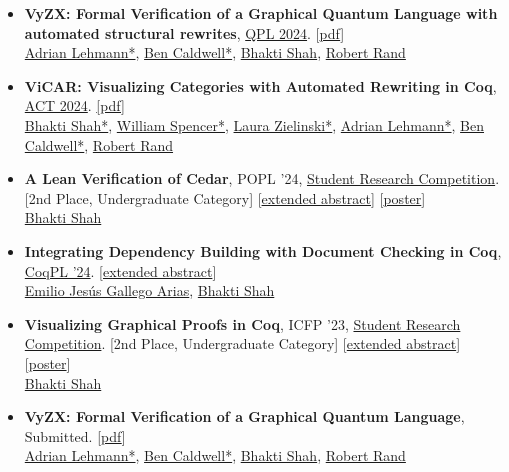 \documentclass[10pt]{res} %
\begin{document}
\begin{resume}
\begin{itemize}
\item \textbf{VyZX: Formal Verification of a Graphical Quantum Language with automated structural rewrites}, \href{https://qpl2024.dc.uba.ar/}{QPL 2024}. [\href{https://bhaktishh.github.io/papers/qpl-24-vyzx.pdf}{pdf}]\\
\href{https://adrianlehmann.net/}{Adrian Lehmann*}, \href{https://people.cs.uchicago.edu/~caldwellb/}{Ben Caldwell*}, \underline{Bhakti Shah}, \href{https://rand.cs.uchicago.edu/}{Robert Rand}

\item \textbf{ViCAR: Visualizing Categories with Automated Rewriting in Coq}, \href{https://oxford24.github.io/}{ACT 2024}. \href{https://arxiv.org/abs/2404.08163}{[pdf]}\\
\underline{Bhakti Shah*}, \href{.}{William Spencer*}, \href{.}{Laura Zielinski*}, \href{https://adrianlehmann.net/}{Adrian Lehmann*}, \href{https://people.cs.uchicago.edu/~caldwellb/}{Ben Caldwell*}, \href{https://rand.cs.uchicago.edu/}{Robert Rand}

\item \textbf{A Lean Verification of Cedar}, POPL '24, \href{https://popl24.sigplan.org/track/POPL-2024-student-research-competition}{Student Research Competition}. [2nd Place, Undergraduate Category] 
[\href{https://bhaktishh.github.io/papers/popl-24-src-abs.pdf}{extended abstract}] [\href{https://bhaktishh.github.io/papers/popl-24-src-poster.pdf}{poster}]\\
\underline{Bhakti Shah} 

\item \textbf{Integrating Dependency Building with Document Checking in Coq}, \href{https://popl24.sigplan.org/home/CoqPL-2024}{CoqPL '24}. [\href{https://bhaktishh.github.io/papers/coqpl-24.pdf}{extended abstract}] \\
\href{https://www.irif.fr/~gallego/}{Emilio Jesús Gallego Arias}, \underline{Bhakti Shah}

\item \textbf{Visualizing Graphical Proofs in Coq}, ICFP '23, \href{https://icfp23.sigplan.org/track/icfp-2023-student-research-competition#About}{Student Research Competition}. [2nd Place, Undergraduate Category] [\href{https://bhaktishh.github.io/papers/icfp-src-23-abs.pdf}{extended abstract}]
[\href{https://bhaktishh.github.io/papers/icfp-23-src-poster.pdf}{poster}] \\
\underline{Bhakti Shah}

\item \textbf{VyZX: Formal Verification of a Graphical Quantum Language}, Submitted. [\href{http://arxiv.org/abs/2311.11571}{pdf}]\\
\href{https://adrianlehmann.net/}{Adrian Lehmann*}, \href{https://people.cs.uchicago.edu/~caldwellb/}{Ben Caldwell*}, \underline{Bhakti Shah}, \href{https://rand.cs.uchicago.edu/}{Robert Rand}



\end{itemize}
\end{resume}
\end{document}

